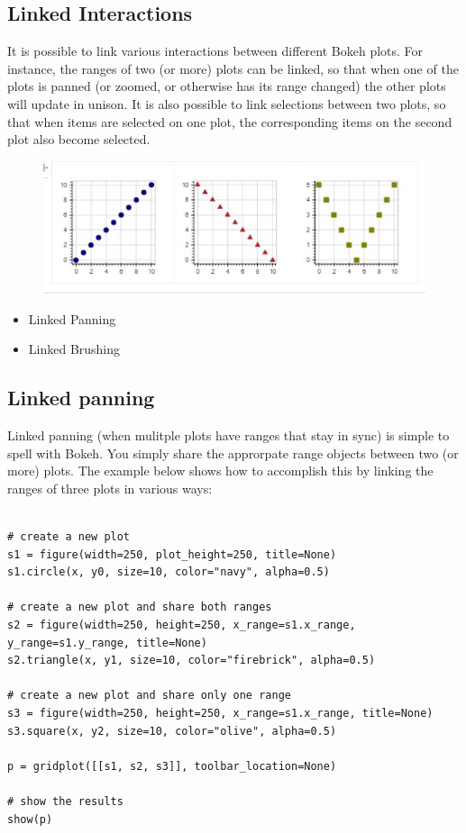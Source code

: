 \documentclass[a4paper,12pt]{article}
\begin{document}
\subsection*{Linked Interactions}
It is possible to link various interactions between different Bokeh plots. For instance, the ranges of two (or more) plots can be linked, so that when one of the plots is panned (or zoomed, or otherwise has its range changed) the other plots will update in unison. It is also possible to link selections between two plots, so that when items are selected on one plot, the corresponding items on the second plot also become selected.
\begin{figure}[h!]
\centering
\includegraphics[width=0.7\linewidth]{images/06-interactions-tut-02}
\end{figure}

\begin{itemize}
	\item Linked Panning 
	\item Linked Brushing
\end{itemize}
\newpage
\subsection*{Linked panning}
Linked panning (when mulitple plots have ranges that stay in sync) is simple to spell with Bokeh. You simply share the approrpate range objects between two (or more) plots. The example below shows how to accomplish this by linking the ranges of three plots in various ways:
\begin{framed}
	\begin{verbatim}

# create a new plot
s1 = figure(width=250, plot_height=250, title=None)
s1.circle(x, y0, size=10, color="navy", alpha=0.5)

# create a new plot and share both ranges
s2 = figure(width=250, height=250, x_range=s1.x_range, y_range=s1.y_range, title=None)
s2.triangle(x, y1, size=10, color="firebrick", alpha=0.5)

# create a new plot and share only one range
s3 = figure(width=250, height=250, x_range=s1.x_range, title=None)
s3.square(x, y2, size=10, color="olive", alpha=0.5)

p = gridplot([[s1, s2, s3]], toolbar_location=None)

# show the results
show(p)
\end{verbatim}
\end{framed}
\end{document}
